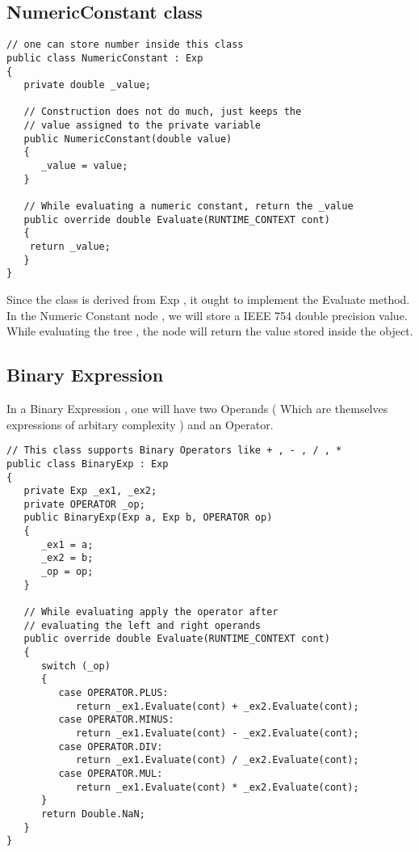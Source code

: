 \subsection{NumericConstant class}
\lstset{style=csharp}
\begin{lstlisting}
// one can store number inside this class
public class NumericConstant : Exp
{
   private double _value;
   
   // Construction does not do much, just keeps the
   // value assigned to the private variable
   public NumericConstant(double value)
   {
      _value = value;
   }
   
   // While evaluating a numeric constant, return the _value
   public override double Evaluate(RUNTIME_CONTEXT cont)
   {
    return _value;
   }
}
\end{lstlisting}
Since the class is derived from Exp , it ought to implement the Evaluate method. In the Numeric Constant node , we will store a IEEE 754 double precision value. While evaluating the tree , the node will return the value stored inside the object.
\clearpage
\subsection{Binary Expression}
In a Binary Expression , one will have two Operands ( Which are themselves expressions of arbitary complexity ) and an Operator.
\lstset{style=csharp}
\begin{lstlisting}
// This class supports Binary Operators like + , - , / , *
public class BinaryExp : Exp
{
   private Exp _ex1, _ex2;
   private OPERATOR _op;
   public BinaryExp(Exp a, Exp b, OPERATOR op)
   {
      _ex1 = a;
      _ex2 = b;
      _op = op;
   }

   // While evaluating apply the operator after 
   // evaluating the left and right operands
   public override double Evaluate(RUNTIME_CONTEXT cont)
   {
      switch (_op)
      {
         case OPERATOR.PLUS:
            return _ex1.Evaluate(cont) + _ex2.Evaluate(cont);
         case OPERATOR.MINUS:
            return _ex1.Evaluate(cont) - _ex2.Evaluate(cont);
         case OPERATOR.DIV:
            return _ex1.Evaluate(cont) / _ex2.Evaluate(cont);
         case OPERATOR.MUL:
            return _ex1.Evaluate(cont) * _ex2.Evaluate(cont);
      }
      return Double.NaN;
   }
}
\end{lstlisting}
\clearpage 
